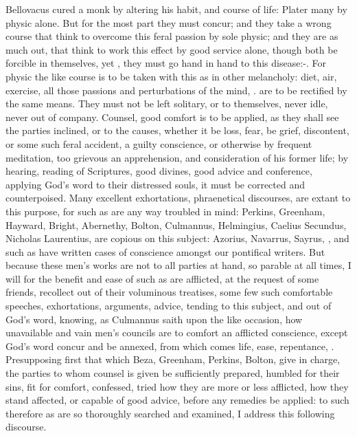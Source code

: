 {Bellovacus cured a monk by altering his habit, and course of
life: Plater many by physic alone. But for the most part they must
concur; and they take a wrong course that think to overcome this feral
passion by sole physic; and they are as much out, that think to work
this effect by good service alone, though both be forcible in
themselves, yet , they must go hand in hand to this
disease:-. For physic the like course is
to be taken with this as in other melancholy: diet, air, exercise, all
those passions and perturbations of the mind, \etc{}. are to be rectified
by the same means. They must not be left solitary, or to themselves,
never idle, never out of company. Counsel, good comfort is to be
applied, as they shall see the parties inclined, or to the causes,
whether it be loss, fear, be grief, discontent, or some such feral
accident, a guilty conscience, or otherwise by frequent meditation, too
grievous an apprehension, and consideration of his former life; by
hearing, reading of Scriptures, good divines, good advice and
conference, applying God's word to their distressed souls, it must be
corrected and counterpoised. Many excellent exhortations, phraenetical
discourses, are extant to this purpose, for such as are any way
troubled in mind: Perkins, Greenham, Hayward, Bright, Abernethy,
Bolton, Culmannus, Helmingius, Caelius Secundus, Nicholas Laurentius,
are copious on this subject: Azorius, Navarrus, Sayrus, \etc{}, and such
as have written cases of conscience amongst our pontifical writers. But
because these men's works are not to all parties at hand, so parable at
all times, I will for the benefit and ease of such as are afflicted, at
the request of some friends, recollect out of their voluminous
treatises, some few such comfortable speeches, exhortations, arguments,
advice, tending to this subject, and out of God's word, knowing, as
Culmannus saith upon the like occasion, how unavailable and vain
men's councils are to comfort an afflicted conscience, except God's
word concur and be annexed, from which comes life, ease, repentance,
\etc{}. Presupposing first that which Beza, Greenham, Perkins, Bolton, give
in charge, the parties to whom counsel is given be sufficiently
prepared, humbled for their sins, fit for comfort, confessed, tried how
they are more or less afflicted, how they stand affected, or capable of
good advice, before any remedies be applied: to such therefore as are
so thoroughly searched and examined, I address this following
discourse.

}
